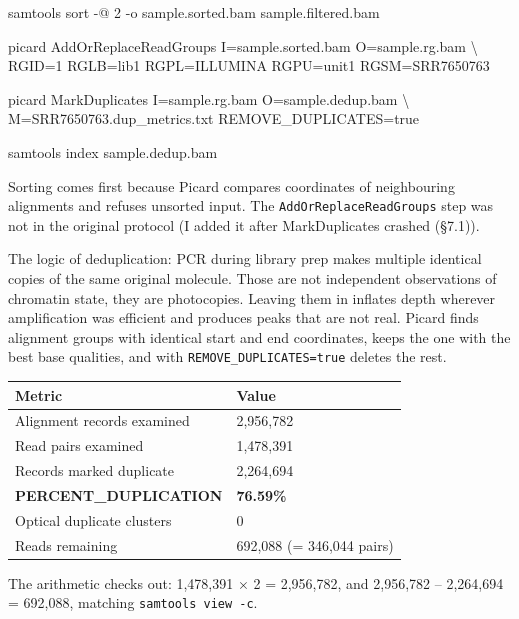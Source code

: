 \documentclass[
  11pt,
  a4paper,
]{article}
\newenvironment{Shaded}{}{}
\newcommand{\AttributeTok}[1]{\textcolor[rgb]{0.49,0.56,0.16}{#1}}
\newcommand{\DataTypeTok}[1]{\textcolor[rgb]{0.56,0.13,0.00}{#1}}
\newcommand{\ExtensionTok}[1]{#1}
\newcommand{\NormalTok}[1]{#1}
\begin{document}
\begin{Shaded}
\begin{Highlighting}[]
\ExtensionTok{samtools}\NormalTok{ sort }\AttributeTok{{-}@}\NormalTok{ 2 }\AttributeTok{{-}o}\NormalTok{ sample.sorted.bam sample.filtered.bam}

\ExtensionTok{picard}\NormalTok{ AddOrReplaceReadGroups I=sample.sorted.bam O=sample.rg.bam }\DataTypeTok{\textbackslash{}}
\NormalTok{  RGID=1 RGLB=lib1 RGPL=ILLUMINA RGPU=unit1 RGSM=SRR7650763}

\ExtensionTok{picard}\NormalTok{ MarkDuplicates I=sample.rg.bam O=sample.dedup.bam }\DataTypeTok{\textbackslash{}}
\NormalTok{  M=SRR7650763.dup\_metrics.txt REMOVE\_DUPLICATES=true}

\ExtensionTok{samtools}\NormalTok{ index sample.dedup.bam}
\end{Highlighting}
\end{Shaded}

Sorting comes first because Picard compares coordinates of neighbouring
alignments and refuses unsorted input. The
\texttt{AddOrReplaceReadGroups} step was not in the original protocol (I
added it after MarkDuplicates crashed (§7.1)).

The logic of deduplication: PCR during library prep makes multiple
identical copies of the same original molecule. Those are not
independent observations of chromatin state, they are photocopies.
Leaving them in inflates depth wherever amplification was efficient and
produces peaks that are not real. Picard finds alignment groups with
identical start and end coordinates, keeps the one with the best base
qualities, and with \texttt{REMOVE\_DUPLICATES=true} deletes the rest.

\begin{longtable}[]{@{}ll@{}}
\toprule\noalign{}
Metric & Value \\
\midrule\noalign{}
\endhead
\bottomrule\noalign{}
\endlastfoot
Alignment records examined & 2,956,782 \\
Read pairs examined & 1,478,391 \\
Records marked duplicate & 2,264,694 \\
\textbf{PERCENT\_DUPLICATION} & \textbf{76.59\%} \\
Optical duplicate clusters & 0 \\
Reads remaining & 692,088 (= 346,044 pairs) \\
\end{longtable}

The arithmetic checks out: 1,478,391 \(\times\) 2 = 2,956,782, and
2,956,782 -- 2,264,694 = 692,088, matching \texttt{samtools\ view\ -c}.
\end{document}

